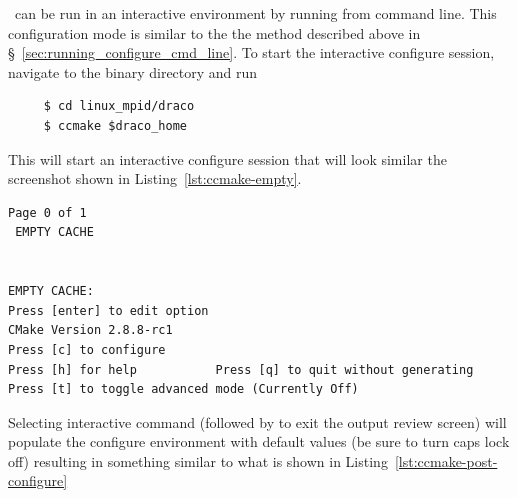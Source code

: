 \cmake\ can be run in an interactive environment by running  from command line.  This configuration mode is similar to the the method described above in \S~\ref{sec:running_configure_cmd_line}.  To start the interactive configure session, navigate to the binary directory and run 
\begin{verbatim}
     $ cd linux_mpid/draco
     $ ccmake $draco_home
\end{verbatim}
This will start an interactive configure session that will look similar the screenshot shown in Listing~\ref{lst:ccmake-empty}.
\begin{lstlisting}[basicstyle=\footnotesize, xleftmargin=0.0in, xrightmargin=0.0in, caption={The \comp{ccmake} screen prior to running configure.}, float=htn, label={lst:ccmake-empty}]
                                                     Page 0 of 1
 EMPTY CACHE


EMPTY CACHE:                                                                              
Press [enter] to edit option                                       CMake Version 2.8.8-rc1
Press [c] to configure
Press [h] for help           Press [q] to quit without generating
Press [t] to toggle advanced mode (Currently Off)
\end{lstlisting}
Selecting interactive command \comp{[c]} (followed by \comp{[e]} to exit the output review screen) 
will populate the configure environment with default values (be sure to turn caps lock off) resulting in something similar to what is shown in Listing~\ref{lst:ccmake-post-configure}
